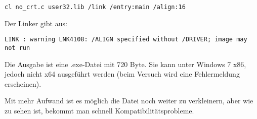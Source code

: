 \begin{lstlisting}
cl no_crt.c user32.lib /link /entry:main /align:16
\end{lstlisting}

Der Linker gibt aus:

\begin{lstlisting}
LINK : warning LNK4108: /ALIGN specified without /DRIVER; image may not run
\end{lstlisting}

Die Ausgabe ist eine .exe-Datei mit 720 Byte.
Sie kann unter Windows 7 x86, jedoch nicht x64 ausgeführt werden (beim Versuch wird
eine Fehlermeldung erscheinen).

Mit mehr Aufwand ist es möglich die Datei noch weiter zu verkleinern, aber wie zu
sehen ist, bekommt man schnell Kompatibilitätsprobleme.

